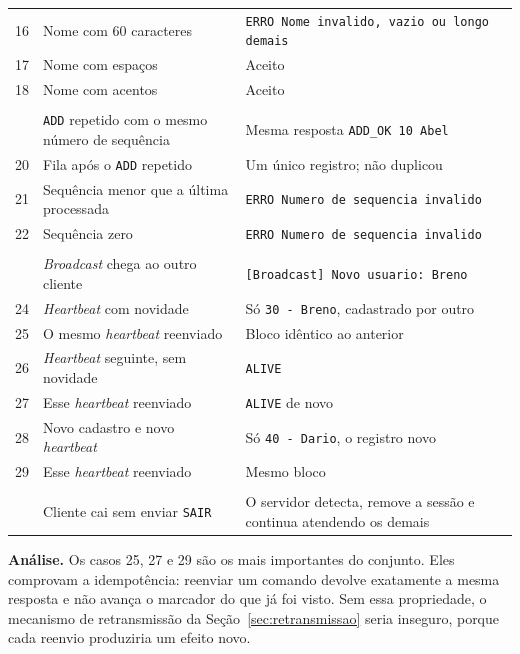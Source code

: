 \documentclass[12pt,a4paper]{article}
\begin{document}
{\begin{longtable}{c L{6.0cm} L{6.0cm}}
16 & Nome com 60 caracteres & \texttt{ERRO Nome invalido, vazio ou longo demais} \\
17 & Nome com espaços & Aceito \\
18 & Nome com acentos & Aceito \\
\addlinespace
{}\\
 & \texttt{ADD} repetido com o mesmo número de sequência & Mesma resposta \texttt{ADD\_OK 10 Abel} \\
20 & Fila após o \texttt{ADD} repetido & Um único registro; não duplicou \\
21 & Sequência menor que a última processada & \texttt{ERRO Numero de sequencia invalido} \\
22 & Sequência zero & \texttt{ERRO Numero de sequencia invalido} \\
\addlinespace
{}\\
 & \textit{Broadcast} chega ao outro cliente & \texttt{[Broadcast] Novo usuario: Breno} \\
24 & \textit{Heartbeat} com novidade & Só \texttt{30 - Breno}, cadastrado por outro \\
25 & O mesmo \textit{heartbeat} reenviado & Bloco idêntico ao anterior \\
26 & \textit{Heartbeat} seguinte, sem novidade & \texttt{ALIVE} \\
27 & Esse \textit{heartbeat} reenviado & \texttt{ALIVE} de novo \\
28 & Novo cadastro e novo \textit{heartbeat} & Só \texttt{40 - Dario}, o registro novo \\
29 & Esse \textit{heartbeat} reenviado & Mesmo bloco \\
\addlinespace
{}\\
 & Cliente cai sem enviar \texttt{SAIR} & O servidor detecta, remove a sessão e continua atendendo os demais \\
\bottomrule
\end{longtable}}

\vspace{6pt}
\noindent\textbf{Análise.} Os casos 25, 27 e 29 são os mais importantes do
conjunto. Eles comprovam a idempotência: reenviar um comando devolve exatamente
a mesma resposta e não avança o marcador do que já foi visto. Sem essa
propriedade, o mecanismo de retransmissão da Seção~\ref{sec:retransmissao} seria
inseguro, porque cada reenvio produziria um efeito novo.
\end{document}

